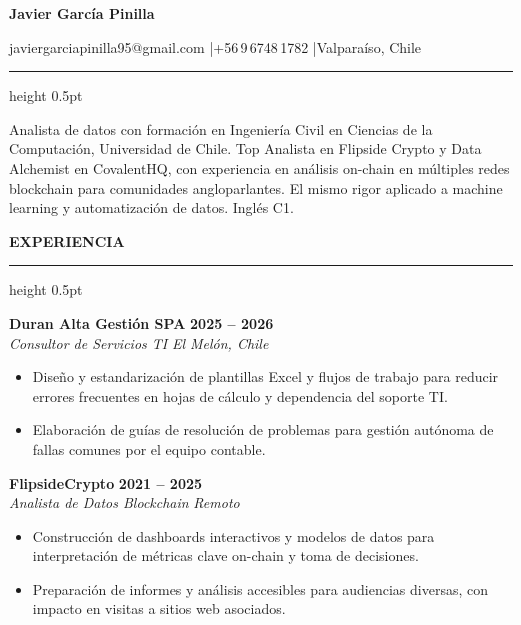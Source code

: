 \documentclass[12pt, a4paper]{article}
\newcommand{\seccion}[1]{%
  \vspace{7pt}%
  {\large\bfseries #1}%
  \vspace{1pt}%
  \hrule height 0.5pt%
  \vspace{2pt}%
}
\newcommand{\trabajo}[4]{%
  \noindent\textbf{#1} \hfill \textbf{#2}\\
  \textit{#3} \hfill \textit{#4}%
  \vspace{1pt}%
}
\begin{document}

{%
  \centering
  {\fontsize{24}{28.8}\selectfont\bfseries Javier García Pinilla}\par
  \vspace{1pt}
  {\fontsize{16}{19}\selectfont javiergarciapinilla95@gmail.com
    \quad|\quad +56\,9\,6748\,1782
    \quad|\quad Valparaíso, Chile}\par
  \vspace{1pt}
  \hrule height 0.5pt
\par}
\vspace{5pt}

\noindent
Analista de datos con formación en Ingeniería Civil en Ciencias de la Computación,
Universidad de Chile. Top Analista en Flipside Crypto y Data Alchemist en CovalentHQ,
con experiencia en análisis on-chain en múltiples redes blockchain para comunidades
angloparlantes. El mismo rigor aplicado a machine learning y automatización de datos.
Inglés C1.

\seccion{EXPERIENCIA}

\trabajo{Duran Alta Gestión SPA}{2025 -- 2026}{Consultor de Servicios TI}{El Melón, Chile}
\begin{itemize}
  \item Diseño y estandarización de plantillas Excel y flujos de trabajo para reducir
        errores frecuentes en hojas de cálculo y dependencia del soporte TI.
  \item Elaboración de guías de resolución de problemas para gestión autónoma de
        fallas comunes por el equipo contable.
\end{itemize}
\vspace{2pt}

\trabajo{FlipsideCrypto}{2021 -- 2025}{Analista de Datos Blockchain}{Remoto}
\begin{itemize}
  \item Construcción de dashboards interactivos y modelos de datos para interpretación
        de métricas clave on-chain y toma de decisiones.
  \item Preparación de informes y análisis accesibles para audiencias diversas,
        con impacto en visitas a sitios web asociados.
\end{itemize}
\vspace{2pt}
\end{document}
